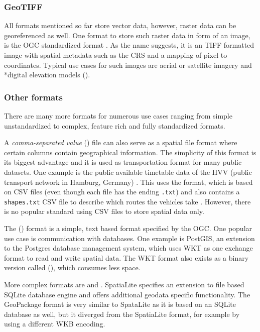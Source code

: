 		\subsubsection{GeoTIFF}
		
			All formats mentioned so far store vector data, however, raster data can be georeferenced as well.
			One format to store such raster data in form of an image, is the OGC standardized  format \cite{ogc-geotiff}.
			As the name suggests, it is an TIFF formatted image with spatial metadata such as the CRS and a mapping of pixel to coordinates.
			Typical use cases for such images are aerial or satellite imagery and *{digital elevation models} ().
		
		\subsubsection{Other formats}
		
			There are many more formats for numerous use cases ranging from simple unstandardized to complex, feature rich and fully standardized formats.
			
			A \emph{comma-separated value} () file can also serve as a spatial file format where certain columns contain geographical information.
			The simplicity of this format is its biggest advantage and it is used as transportation format for many public datasets.
			One example is the public available timetable data of the HVV (public transport network in Hamburg, Germany) \cite{hvv-fahrplandaten}.
			This uses the  format, which is based on CSV files (even though each file has the ending \texttt{.txt}) and also contains a \texttt{shapes.txt} CSV file to describe which routes the vehicles take \cite{google-gtfs}.
			However, there is no popular standard using CSV files to store spatial data only.
			
			The  () format is a simple, text based format specified by the OGC\cite[51]{ogc-sfa}.
			One popular use case is communication with databases.
			One example is PostGIS, an extension to the Postgres database management system, which uses WKT as one exchange format to read and write spatial data\cite{postgis-doc-wkt}.
			The WKT format also exists as a binary version called  (), which consumes less space.
			
			More complex formats are  and .
			SpatiaLite specifies an extension to file based SQLite database engine and offers additional geodata specific functionality\cite{spatialite-website}.
			The GeoPackage format is very similar to SpataLite as it is based on an SQLite database as well, but it diverged from the SpatiaLite format, for example by using a different WKB encoding\cite{geopackage-faq}.
			
